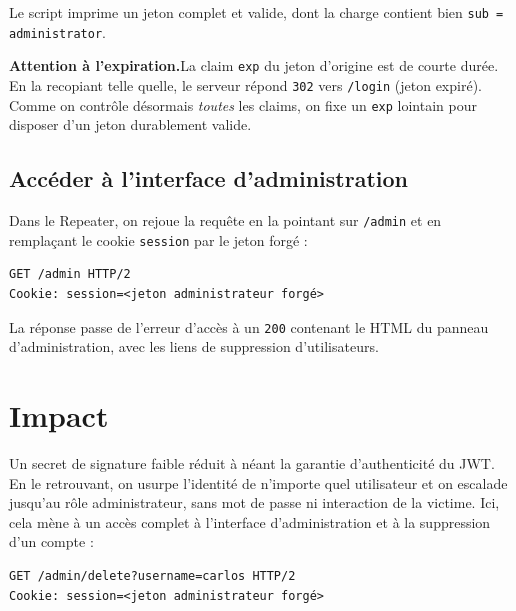 \documentclass[11pt,a4paper]{article}
\begin{document}
Le script imprime un jeton complet et valide, dont la charge contient bien
\texttt{sub = administrator}.


\begin{warnbox}
\textbf{Attention à l'expiration.}\quad La claim \texttt{exp} du jeton d'origine
est de courte durée. En la recopiant telle quelle, le serveur répond
\texttt{302} vers \texttt{/login} (jeton expiré). Comme on contrôle désormais
\emph{toutes} les claims, on fixe un \texttt{exp} lointain pour disposer d'un
jeton durablement valide.
\end{warnbox}

\subsection{Accéder à l'interface d'administration}
Dans le Repeater, on rejoue la requête en la pointant sur \texttt{/admin} et en
remplaçant le cookie \texttt{session} par le jeton forgé :

\begin{lstlisting}
GET /admin HTTP/2
Cookie: session=<jeton administrateur forgé>
\end{lstlisting}

La réponse passe de l'erreur d'accès à un \texttt{200} contenant le HTML du
panneau d'administration, avec les liens de suppression d'utilisateurs.


\section{Impact}
Un secret de signature faible réduit à néant la garantie d'authenticité du JWT.
En le retrouvant, on usurpe l'identité de n'importe quel utilisateur et on
escalade jusqu'au rôle administrateur, sans mot de passe ni interaction de la
victime. Ici, cela mène à un accès complet à l'interface d'administration et à
la suppression d'un compte :

\begin{lstlisting}
GET /admin/delete?username=carlos HTTP/2
Cookie: session=<jeton administrateur forgé>
\end{lstlisting}
\end{document}
